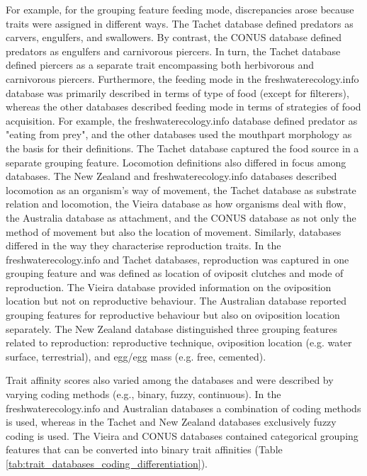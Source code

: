 \documentclass[12pt]{article}
\begin{document}
For example, for the grouping feature feeding mode, discrepancies arose because traits were assigned in different ways. The Tachet database defined predators as carvers, engulfers, and swallowers. By contrast, the CONUS database defined predators as engulfers and carnivorous piercers. In turn, the Tachet database defined piercers as a separate trait encompassing both herbivorous and carnivorous piercers. Furthermore, the feeding mode in the freshwaterecology.info database was primarily described in terms of type of food (except for filterers), whereas the other databases described feeding mode in terms of strategies of food acquisition. For example, the freshwaterecology.info database defined predator as "eating from prey", and the other databases used the mouthpart morphology as the basis for their definitions. The Tachet database captured the food source in a separate grouping feature. Locomotion definitions also differed in focus among databases. The New Zealand and freshwaterecology.info databases described locomotion as an organism’s way of movement, the Tachet database as substrate relation and locomotion, the Vieira database as how organisms deal with flow, the Australia database as attachment, and the CONUS database as not only the method of movement but also the location of movement. Similarly, databases differed in the way they characterise reproduction traits. In the freshwaterecology.info and Tachet databases, reproduction was captured in one grouping feature and was defined as location of oviposit clutches and mode of reproduction. The Vieira database provided information on the oviposition location but not on reproductive behaviour. The Australian database reported grouping features for reproductive behaviour but also on oviposition location separately. The New Zealand database distinguished three grouping features related to reproduction: reproductive technique, oviposition location (e.g. water surface, terrestrial), and egg/egg mass (e.g. free, cemented).

Trait affinity scores also varied among the databases and were described by varying coding methods (e.g., binary, fuzzy, continuous). In the freshwaterecology.info and Australian databases a combination of coding methods is used, whereas in the Tachet and New Zealand databases exclusively fuzzy coding is used. The Vieira and CONUS databases contained categorical grouping features that can be converted into binary trait affinities (Table \ref{tab:trait_databases_coding_differentiation}).

\end{document}
